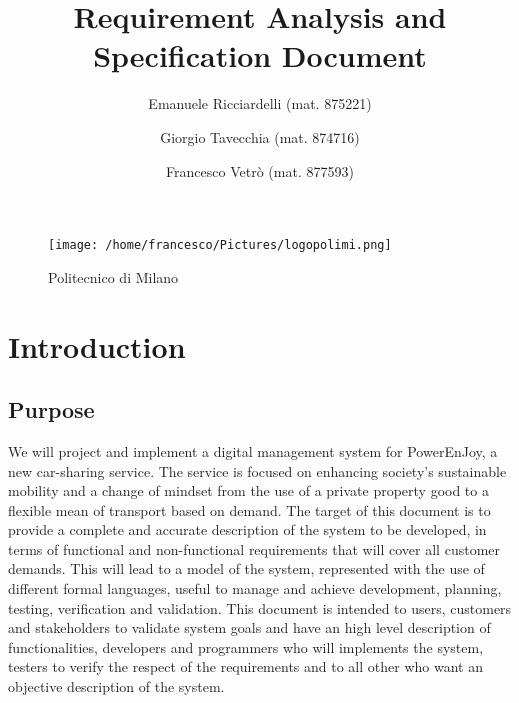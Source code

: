 \documentclass[10pt, a4paper,titlepage]{article}
\begin{document}
\begin{titlepage}
\title{Requirement Analysis and Specification Document}
\author{Emanuele Ricciardelli (mat. 875221) \and Giorgio Tavecchia (mat. 874716) \and Francesco Vetrò (mat. 877593)}
\begin{figure}
\texttt{[image: /home/francesco/Pictures/logopolimi.png]}
\caption{Politecnico di Milano}
\label{fig:logo}
\end{figure}
\maketitle
\end{titlepage}
\tableofcontents
\pagebreak
\section{Introduction}
\subsection{Purpose}
We will project and implement a digital management system for PowerEnJoy, a new car-sharing service. The service is focused on enhancing society's sustainable mobility and a change of mindset from the use of a private property good to a flexible mean of transport based on demand.
The target of this document is to provide a complete and accurate description of the system to be developed, in terms of functional and non-functional requirements that will cover all customer demands. This will lead to a model of the system, represented with the use of different formal languages, useful to manage and achieve development, planning, testing, verification and validation.
This document is intended to users, customers and stakeholders to validate system goals and have an high level description of functionalities, developers and programmers who will implements the system, testers to verify the respect of the requirements and to all other who want an objective description of the system.
\end{document}

